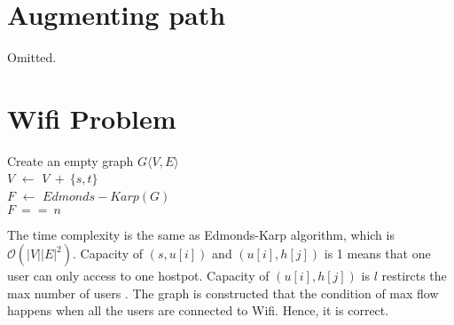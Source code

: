 \documentclass[12pt,a4paper]{article}
\theoremstyle{definition}
\begin{document}
\section{Augmenting path}
Omitted.
\section{Wifi Problem}
\begin{algorithm}[H]
    \caption{$WIFI(r,l,loc,pos)$} 
    Create an empty graph $G \langle V, E \rangle$ \\
    $V$ $\gets$ $V\ +\ \{s,t\}$ \\
    $F$ $\gets$ $Edmonds-Karp(G)$ \\
    \Return $F\ ==\ n$
\end{algorithm}
The time complexity is the same as Edmonds-Karp algorithm, which is $\mathcal{O}(|V||E|^2)$. 
Capacity of $(s, u[i])$ and $(u[i],h[j])$ is 1 means that one user can only access to one hostpot. Capacity of $(u[i],h[j])$ is $l$ restircts the max number of users . The graph is constructed that the condition of max flow happens when all the users are connected to Wifi. Hence, it is correct.
\end{document}
